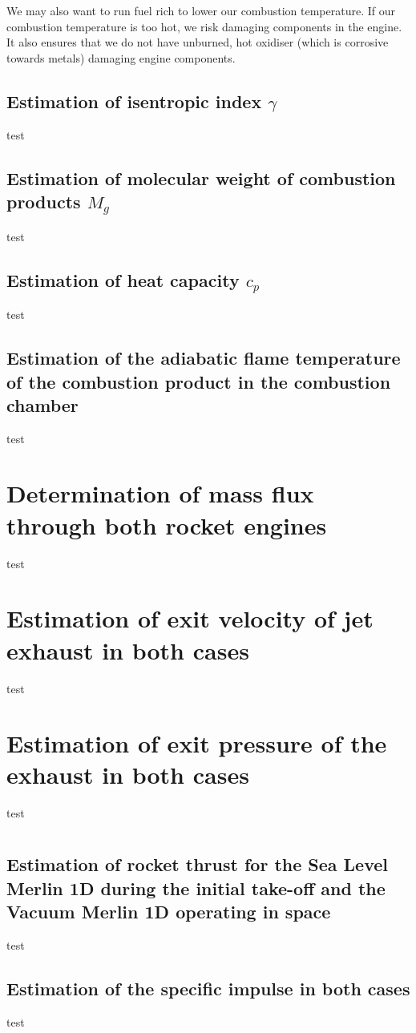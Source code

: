 \documentclass[11pt]{article}
\numberwithin{equation}{section}
\begin{document}
We may also want to run fuel rich to lower our combustion temperature. If our combustion temperature is too hot, we risk damaging components in the engine. It also ensures that we do not have unburned, hot oxidiser (which is corrosive towards metals) damaging engine components.
\subsection{Estimation of isentropic index $\gamma$}
test
\subsection{Estimation of molecular weight of combustion products $M_g$}
test
\subsection{Estimation of heat capacity $c_p$}
test
\subsection{Estimation of the adiabatic flame temperature of the combustion product in the combustion chamber}
test
\section{Determination of mass flux through both rocket engines}
test
\section{Estimation of exit velocity of jet exhaust in both cases}
test
\section{Estimation of exit pressure of the exhaust in both cases}
test
\section{}
\subsection{Estimation of  rocket thrust for the Sea Level Merlin 1D during the initial take-off and the Vacuum Merlin 1D operating in space}
test
\subsection{Estimation of the specific impulse in both cases}
test
\end{document}
